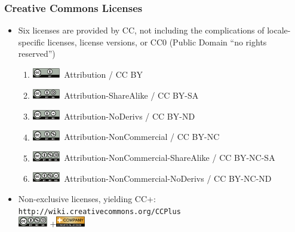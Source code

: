\documentclass[mathserif,xcolor=dvipsnames,handout]{beamer}
\begin{document}
     \begin{frame}[t]
         \frametitle{Creative Commons Licenses}
         \begin{itemize}
             \item<2-> Six licenses are provided by CC, not including the
             complications of locale-specific licenses, license versions, or
             CC0 (Public Domain ``no rights reserved'')
             \begin{enumerate}
               \item<3-> \includegraphics[width=0.1\textwidth]{by.pdf}\ Attribution
               / CC BY
               \item<4-> \includegraphics[width=0.1\textwidth]{by_sa.pdf}\
               Attribution-ShareAlike / CC BY-SA
               \item<5-> \includegraphics[width=0.1\textwidth]{by_nd.pdf}\
               Attribution-NoDerivs / CC BY-ND
               \item<6-> \includegraphics[width=0.1\textwidth]{by_nc.pdf}\
               Attribution-NonCommercial / CC BY-NC
               \item<7-> \includegraphics[width=0.1\textwidth]{by_nc_sa.pdf}\
               Attribution-NonCommercial-ShareAlike / CC BY-NC-SA
               \item<8-> \includegraphics[width=0.1\textwidth]{by_nc_nd.pdf}\
               Attribution-NonCommercial-NoDerivs / CC BY-NC-ND
             \end{enumerate}
             \item<9-> Non-exclusive licenses, yielding CC+:
             \texttt{http://wiki.creativecommons.org/CCPlus} \\
               \includegraphics[width=0.1\textwidth]{by_nc_sa.pdf}
               +\includegraphics[width=0.1\textwidth]{CommercialLicenseButton.pdf}
         \end{itemize}
     \end{frame}
\end{document}
